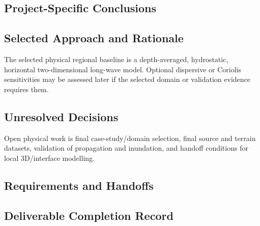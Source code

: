 
\subsection{Project-Specific Conclusions}
\label{sec:res-phy-syn-conclusions}


\subsection{Selected Approach and Rationale}
\label{sec:res-phy-syn-selected-approach}


The selected physical regional baseline is a depth-averaged,
hydrostatic, horizontal two-dimensional long-wave model. Optional
dispersive or Coriolis sensitivities may be assessed later if the
selected domain or validation evidence requires them.

\subsection{Unresolved Decisions}
\label{sec:res-phy-syn-unresolved-decisions}


Open physical work is final case-study/domain selection, final source
and terrain datasets, validation of propagation and inundation, and
handoff conditions for local 3D/interface modelling.

\subsection{Requirements and Handoffs}
\label{sec:res-phy-syn-requirements}


\subsection{Deliverable Completion Record}
\label{sec:res-phy-syn-completion-record}

%
%
%
